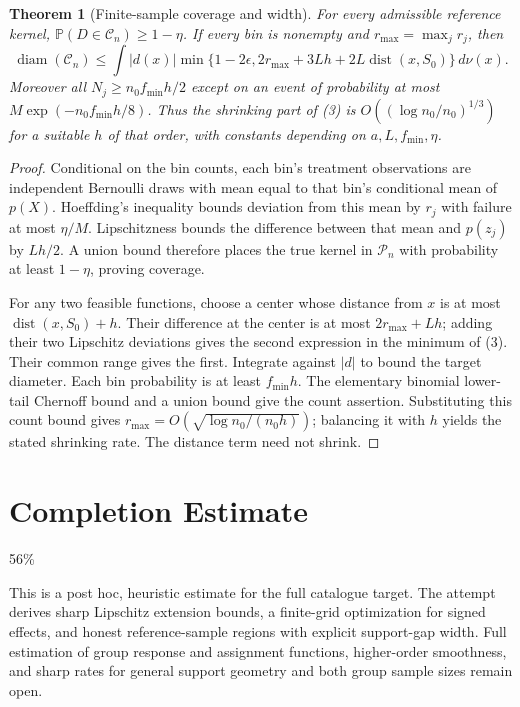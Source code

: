 \documentclass[11pt,a4paper]{article}
\newtheorem{theorem}{Theorem}[section]
\theoremstyle{definition}
\theoremstyle{remark}
\newcommand{\Prob}{\mathbb{P}}
\begin{document}
\begin{theorem}[Finite-sample coverage and width]
For every admissible reference kernel, $\Prob(D\in\mathcal C_n)\geq1-\eta$. If every bin is nonempty and $r_{\max}=\max_jr_j$, then
\[
 \operatorname{diam}(\mathcal C_n)\leq
 \int |d(x)|\min\{1-2\epsilon,
       2r_{\max}+3Lh+2L\operatorname{dist}(x,S_0)\}\,d\nu(x).\tag{3}
\]
Moreover all $N_j\geq n_0f_{\min}h/2$ except on an event of probability at most $M\exp(-n_0f_{\min}h/8)$. Thus the shrinking part of (3) is $O((\log n_0/n_0)^{1/3})$ for a suitable $h$ of that order, with constants depending on $a,L,f_{\min},\eta$.
\end{theorem}
\begin{proof}
Conditional on the bin counts, each bin's treatment observations are independent Bernoulli draws with mean equal to that bin's conditional mean of $p(X)$. Hoeffding's inequality bounds deviation from this mean by $r_j$ with failure at most $\eta/M$. Lipschitzness bounds the difference between that mean and $p(z_j)$ by $Lh/2$. A union bound therefore places the true kernel in $\mathcal P_n$ with probability at least $1-\eta$, proving coverage.

For any two feasible functions, choose a center whose distance from $x$ is at most $\operatorname{dist}(x,S_0)+h$. Their difference at the center is at most $2r_{\max}+Lh$; adding their two Lipschitz deviations gives the second expression in the minimum of (3). Their common range gives the first. Integrate against $|d|$ to bound the target diameter. Each bin probability is at least $f_{\min}h$. The elementary binomial lower-tail Chernoff bound and a union bound give the count assertion. Substituting this count bound gives $r_{\max}=O(\sqrt{\log n_0/(n_0h)})$; balancing it with $h$ yields the stated shrinking rate. The distance term need not shrink.
\end{proof}

\section{Completion Estimate}
56\%

This is a post hoc, heuristic estimate for the full catalogue target.
The attempt derives sharp Lipschitz extension bounds, a finite-grid optimization for signed effects, and honest reference-sample regions with explicit support-gap width. Full estimation of group response and assignment functions, higher-order smoothness, and sharp rates for general support geometry and both group sample sizes remain open.
\end{document}
